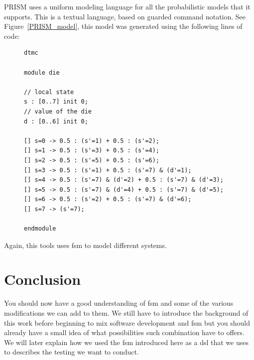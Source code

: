 \documentclass[12pt]{article}
\theoremstyle{definition}
\theoremstyle{definition}
\theoremstyle{remark}
\begin{document}
PRISM uses a uniform modeling language for all the probabilistic models that it supports. This is a textual language, based on guarded command notation. See Figure~\ref{PRISM_model}, this model was generated using the following lines of code:

\lstset{
  showspaces=false,
  showstringspaces=false,
  showtabs=false
}

\begin{figure}
\label{PRISM_code}
\begin{lstlisting}[caption="Dice model in PRISM",label={lst:PRISM_code}]
dtmc

module die

// local state
s : [0..7] init 0;
// value of the die
d : [0..6] init 0;

[] s=0 -> 0.5 : (s'=1) + 0.5 : (s'=2);
[] s=1 -> 0.5 : (s'=3) + 0.5 : (s'=4);
[] s=2 -> 0.5 : (s'=5) + 0.5 : (s'=6);
[] s=3 -> 0.5 : (s'=1) + 0.5 : (s'=7) & (d'=1);
[] s=4 -> 0.5 : (s'=7) & (d'=2) + 0.5 : (s'=7) & (d'=3);
[] s=5 -> 0.5 : (s'=7) & (d'=4) + 0.5 : (s'=7) & (d'=5);
[] s=6 -> 0.5 : (s'=2) + 0.5 : (s'=7) & (d'=6);
[] s=7 -> (s'=7);

endmodule
\end{lstlisting}
\end{figure}

Again, this tools uses \gls{fsm} to model different systems.



\section{Conclusion}


You should now have a good understanding of \gls{fsm} and some of the various modifications we can add to them. We still have to introduce the background of this work before beginning to mix software development and \gls{fsm} but you should already have a small idea of what possibilities such combination have to offers. We will later explain how we used the \gls{fsm} introduced here as a \gls{dsl} that we uses to describes the testing we want to conduct.


\end{document}
